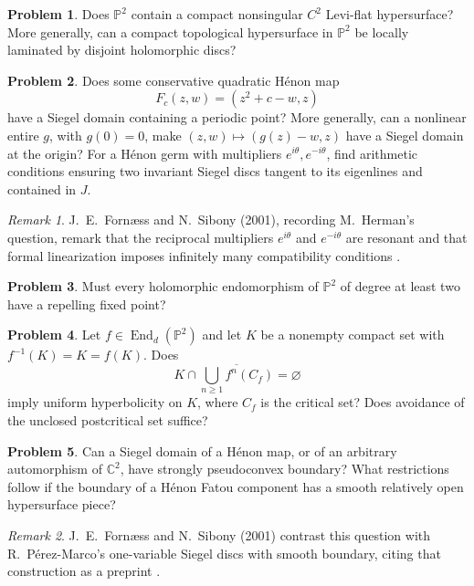 \documentclass[11pt,reqno]{amsart}
\theoremstyle{definition}
\newtheorem{problem}{Problem}[section]
\theoremstyle{remark}
\newtheorem*{remark}{Remark}
\begin{document}
\begin{problem}\label{FS-3.10a}
Does $\mathbb P^2$ contain a compact nonsingular $C^2$ Levi-flat hypersurface? More generally, can a compact topological hypersurface in $\mathbb P^2$ be locally laminated by disjoint holomorphic discs?
\end{problem}


\begin{problem}\label{b95-10-2-3}\label{FS-2.7}\label{FS-2.24}
Does some conservative quadratic H\'enon map
\[
 F_c(z,w)=(z^2+c-w,z)
\]
have a Siegel domain containing a periodic point? More generally, can a nonlinear entire $g$, with $g(0)=0$, make $(z,w)\mapsto(g(z)-w,z)$ have a Siegel domain at the origin? For a H\'enon germ with multipliers $e^{i\theta},e^{-i\theta}$, find arithmetic conditions ensuring two invariant Siegel discs tangent to its eigenlines and contained in $J$.
\end{problem}
\begin{remark}
J.~E.~Forn\ae ss and N.~Sibony (2001), recording M.~Herman's question, remark that the reciprocal multipliers $e^{i\theta}$ and $e^{-i\theta}$ are resonant and that formal linearization imposes infinitely many compatibility conditions \cite[Question~2.7]{FS2001}.
\end{remark}

\begin{problem}\label{b95-10-3-1}
Must every holomorphic endomorphism of $\mathbb P^2$ of degree at least two have a repelling fixed point?
\end{problem}


\begin{problem}\label{b95-10-3-6}
Let $f\in\operatorname{End}_d(\mathbb P^2)$ and let $K$ be a nonempty compact set with $f^{-1}(K)=K=f(K)$. Does
\[
 K\cap\overline{\bigcup_{n\geq1}f^n(C_f)}=\varnothing
\]
imply uniform hyperbolicity on $K$, where $C_f$ is the critical set? Does avoidance of the unclosed postcritical set suffice?
\end{problem}


\begin{problem}\label{FS-2.8}\label{FS-2.11}
Can a Siegel domain of a H\'enon map, or of an arbitrary automorphism of $\mathbb C^2$, have strongly pseudoconvex boundary? What restrictions follow if the boundary of a H\'enon Fatou component has a smooth relatively open hypersurface piece?
\end{problem}
\begin{remark}
J.~E.~Forn\ae ss and N.~Sibony (2001) contrast this question with R.~P\'erez-Marco's one-variable Siegel discs with smooth boundary, citing that construction as a preprint \cite[Question~2.8]{FS2001}.
\end{remark}
\end{document}
